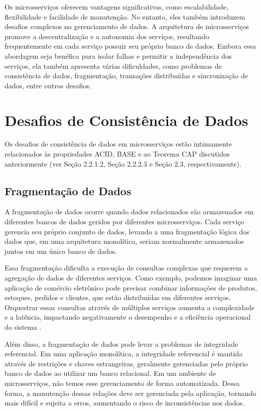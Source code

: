 Os microsserviços oferecem vantagens significativas, como escalabilidade, flexibilidade e facilidade de manutenção. No entanto, eles também introduzem desafios complexos no gerenciamento de dados. A arquitetura de microsserviços promove a descentralização e a autonomia dos serviços, resultando frequentemente em cada serviço possuir seu próprio banco de dados. Embora essa abordagem seja benéfica para isolar falhas e permitir a independência dos serviços, ela também apresenta várias dificuldades, como problemas de consistência de dados, fragmentação, transações distribuídas e sincronização de dados, entre outros desafios.

\section{Desafios de Consistência de Dados}

Os desafios de consistência de dados em microsserviços estão intimamente relacionados às propriedades ACID, BASE e ao Teorema CAP discutidos anteriormente (ver Seção 2.2.1.2, Seção 2.2.2.3 e Seção 2.3, respectivamente).

\subsection{Fragmentação de Dados}

A fragmentação de dados ocorre quando dados relacionados são armazenados em diferentes bancos de dados geridos por diferentes microsserviços. Cada serviço gerencia seu próprio conjunto de dados, levando a uma fragmentação lógica dos dados que, em uma arquitetura monolítica, seriam normalmente armazenados juntos em um único banco de dados.

Essa fragmentação dificulta a execução de consultas complexas que requerem a agregação de dados de diferentes serviços. Como exemplo, podemos imaginar uma aplicação de comércio eletrônico pode precisar combinar informações de produtos, estoques, pedidos e clientes, que estão distribuídas em diferentes serviços. Orquestrar essas consultas através de múltiplos serviços aumenta a complexidade e a latência, impactando negativamente o desempenho e a eficiência operacional do sistema \cite{fowler2015}.

Além disso, a fragmentação de dados pode levar a problemas de integridade referencial. Em uma aplicação monolítica, a integridade referencial é mantida através de restrições e chaves estrangeiras, geralmente gerenciadas pelo próprio banco de dados ao utilizar um banco relacional. Em um ambiente de microsserviços, não temos esse gerenciamento de forma automatizada. Dessa forma, a manutenção dessas relações deve ser gerenciada pela aplicação, tornando mais difícil e sujeita a erros, aumentando o risco de inconsistências nos dados.


